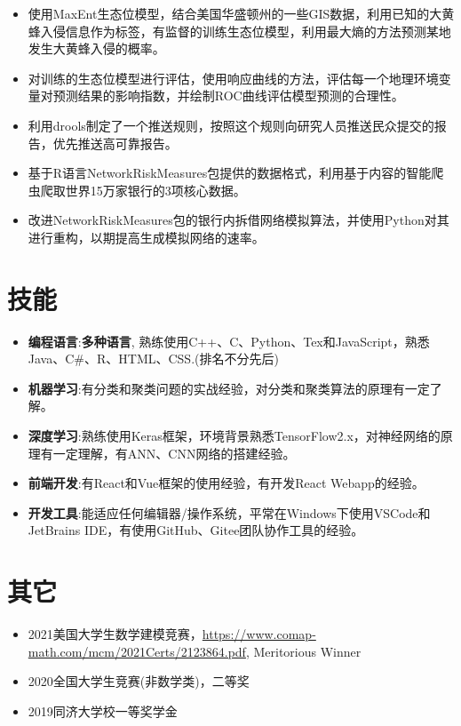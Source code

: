 \documentclass{resume}
\begin{document}
\begin{itemize}[parsep=0.25ex]
	\item 使用MaxEnt生态位模型，结合美国华盛顿州的一些GIS数据，利用已知的大黄蜂入侵信息作为标签，有监督的训练生态位模型，利用最大熵的方法预测某地发生大黄蜂入侵的概率。
	\item 对训练的生态位模型进行评估，使用响应曲线的方法，评估每一个地理环境变量对预测结果的影响指数，并绘制ROC曲线评估模型预测的合理性。
	\item 利用drools制定了一个推送规则，按照这个规则向研究人员推送民众提交的报告，优先推送高可靠报告。
\end{itemize}
\begin{itemize}[parsep=0.25ex]
	\item 基于R语言NetworkRiskMeasures包提供的数据格式，利用基于内容的智能爬虫爬取世界15万家银行的3项核心数据。
	\item 改进NetworkRiskMeasures包的银行内拆借网络模拟算法，并使用Python对其进行重构，以期提高生成模拟网络的速率。
\end{itemize}
\section{技能}
\begin{itemize}[parsep=0.25ex]
\item \textbf{编程语言}:\textbf{多种语言},
熟练使用C++、C、Python、Tex和JavaScript，熟悉Java、C\#、R、HTML、CSS.(排名不分先后)
\item \textbf{机器学习}:有分类和聚类问题的实战经验，对分类和聚类算法的原理有一定了解。
\item \textbf{深度学习}:熟练使用Keras框架，环境背景熟悉TensorFlow2.x，对神经网络的原理有一定理解，有ANN、CNN网络的搭建经验。
\item \textbf{前端开发}:有React和Vue框架的使用经验，有开发React Webapp的经验。
\item \textbf{开发工具}:能适应任何编辑器/操作系统，平常在Windows下使用VSCode和JetBrains IDE，有使用GitHub、Gitee团队协作工具的经验。
\end{itemize}
\section{其它}
\begin{itemize}[parsep=0.25ex]
	\item 2021美国大学生数学建模竞赛，\url{https://www.comap-math.com/mcm/2021Certs/2123864.pdf}, Meritorious Winner
	\item 2020全国大学生竞赛(非数学类)，二等奖
	\item 2019同济大学校一等奖学金
	
\end{itemize}
\end{document}
